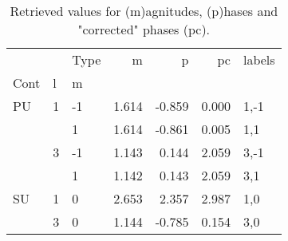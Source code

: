 \documentclass[10pt]{article}
\begin{document}
\begin{table}

\begin{tabular}{lllrrrl}
\toprule
   &   & Type &     m &      p &    pc & labels \\
Cont & l & m &       &        &       &        \\
\midrule
PU & 1 & -1 & 1.614 & -0.859 & 0.000 &   1,-1 \\
   &   &  1 & 1.614 & -0.861 & 0.005 &    1,1 \\
   & 3 & -1 & 1.143 &  0.144 & 2.059 &   3,-1 \\
   &   &  1 & 1.142 &  0.143 & 2.059 &    3,1 \\
SU & 1 &  0 & 2.653 &  2.357 & 2.987 &    1,0 \\
   & 3 &  0 & 1.144 & -0.785 & 0.154 &    3,0 \\
\bottomrule
\end{tabular}

\caption{{\label{tab:aggMatE}Retrieved values for (m)agnitudes, (p)hases and "corrected" phases (pc).}}
\end{table}
\end{document}
